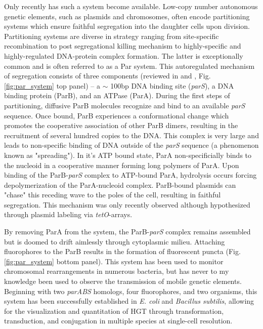 Only recently has such a system become available. Low-copy number autonomous
genetic elements, such as plasmids and chromosomes, often encode partitioning
systems which ensure faithful segregation into the daughter cells upon division.
Partitioning systems are diverse in strategy ranging from site-specific
recombination to post segregational killing mechanism to highly-specific and
highly-regulated DNA-protein complex formation. The latter is exceptionally
common and is often referred to as a Par system. This autoregulated mechanism of
segregation consists of three components (reviewed in \citet{Funnell:2004wi} and
\citet{Bignell:2001ti},
Fig. \ref{fig:par_system} top panel) -- a $\sim$ 100bp DNA binding site
(\textit{parS}), a DNA binding protein (ParB), and an ATPase (ParA). During the
first steps of partitioning, diffusive ParB molecules recognize and bind to an
available \textit{parS} sequence. Once bound, ParB experiences a conformational
change which promotes the cooperative association of other ParB dimers,
resulting in the recruitment of several hundred copies to the DNA. This complex
is very large and leads to non-specific binding of DNA outside of the
\textit{parS} sequence (a phenomenon known as "spreading"). In it's ATP bound
state, ParA non-specificially binds to the nucleoid in a cooperative manner
forming long polymers of ParA. Upon binding of the ParB-\textit{parS} complex to
ATP-bound ParA, hydrolysis occurs forcing depolymerization of the ParA-nucleoid
complex. ParB-bound plasmids can "chase" this receding wave to the poles of the
cell, resulting in faithful segregation.  This mechanism was only recently
observed although hypothesized through plasmid labeling via
\textit{tetO}-arrays\cite{Ringgaard:2009uh}.

By removing ParA from the system, the ParB-\textit{parS} complex remains
assembled but is doomed to drift aimlessly through cytoplasmic milieu. Attaching
fluorophores to the ParB results in the formation of fluorescent puncta (Fig.
\ref{fig:par_system} bottom panel). This system has been used to monitor
chromosomal rearrangements in numerous bacteria, but has never to my knowledge
been used to observe the transmission of mobile genetic
elements\cite{Nielsen:2006hmb, Nielsen:2007cta, Shebelut:2010ic,
Broedersz:2014jz}. Beginning with two \textit{parABS} homologs, four
fluorophores, and two organisms, this system has been successfully established
in \textit{E. coli} and \textit{Bacillus subtilis}, allowing for the
visualization and quantitation of HGT through transformation, transduction, and
conjugation in multiple species at single-cell resolution.


